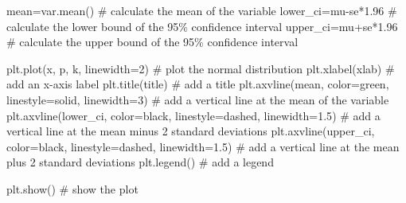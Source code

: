 \documentclass[
  letterpaper,
  DIV=11,
  numbers=noendperiod]{scrreprt}
\newenvironment{Shaded}{\begin{snugshade}}{\end{snugshade}}
\newcommand{\CommentTok}[1]{\textcolor[rgb]{0.37,0.37,0.37}{#1}}
\newcommand{\DecValTok}[1]{\textcolor[rgb]{0.68,0.00,0.00}{#1}}
\newcommand{\FloatTok}[1]{\textcolor[rgb]{0.68,0.00,0.00}{#1}}
\newcommand{\NormalTok}[1]{\textcolor[rgb]{0.00,0.23,0.31}{#1}}
\newcommand{\OperatorTok}[1]{\textcolor[rgb]{0.37,0.37,0.37}{#1}}
\newcommand{\StringTok}[1]{\textcolor[rgb]{0.13,0.47,0.30}{#1}}
\begin{document}
\begin{Shaded}
\begin{Highlighting}[]
\NormalTok{            mean}\OperatorTok{=}\NormalTok{var.mean() }\CommentTok{\# calculate the mean of the variable}
\NormalTok{            lower\_ci}\OperatorTok{=}\NormalTok{mu}\OperatorTok{{-}}\NormalTok{se}\OperatorTok{*}\FloatTok{1.96} \CommentTok{\# calculate the lower bound of the 95\% confidence interval}
\NormalTok{            upper\_ci}\OperatorTok{=}\NormalTok{mu}\OperatorTok{+}\NormalTok{se}\OperatorTok{*}\FloatTok{1.96} \CommentTok{\# calculate the upper bound of the 95\% confidence interval}

\NormalTok{            plt.plot(x, p, }\StringTok{\textquotesingle{}k\textquotesingle{}}\NormalTok{, linewidth}\OperatorTok{=}\DecValTok{2}\NormalTok{) }\CommentTok{\# plot the normal distribution}
\NormalTok{            plt.xlabel(xlab) }\CommentTok{\# add an x{-}axis label}
\NormalTok{            plt.title(title) }\CommentTok{\# add a title}
\NormalTok{            plt.axvline(mean, color}\OperatorTok{=}\StringTok{\textquotesingle{}green\textquotesingle{}}\NormalTok{, linestyle}\OperatorTok{=}\StringTok{\textquotesingle{}solid\textquotesingle{}}\NormalTok{, linewidth}\OperatorTok{=}\DecValTok{3}\NormalTok{) }\CommentTok{\# add a vertical line at the mean of the variable}
\NormalTok{            plt.axvline(lower\_ci, color}\OperatorTok{=}\StringTok{\textquotesingle{}black\textquotesingle{}}\NormalTok{, linestyle}\OperatorTok{=}\StringTok{\textquotesingle{}dashed\textquotesingle{}}\NormalTok{, linewidth}\OperatorTok{=}\FloatTok{1.5}\NormalTok{) }\CommentTok{\# add a vertical line at the mean minus 2 standard deviations}
\NormalTok{            plt.axvline(upper\_ci, color}\OperatorTok{=}\StringTok{\textquotesingle{}black\textquotesingle{}}\NormalTok{, linestyle}\OperatorTok{=}\StringTok{\textquotesingle{}dashed\textquotesingle{}}\NormalTok{, linewidth}\OperatorTok{=}\FloatTok{1.5}\NormalTok{) }\CommentTok{\# add a vertical line at the mean plus 2 standard deviations}
\NormalTok{            plt.legend() }\CommentTok{\# add a legend}
            
\NormalTok{        plt.show()  }\CommentTok{\# show the plot }
\end{Highlighting}
\end{Shaded}

\begin{Shaded}
\end{Shaded}
\end{document}
